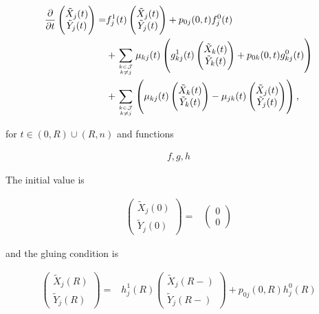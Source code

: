 \documentclass{book}
\newcommand{\1}[1]{\mathbbm{1}_{\left\lbrace #1 \right\rbrace}}
\theoremstyle{break}
\theoremstyle{remark}
\numberwithin{equation}{section}
\begin{document}
\begin{align*}
\frac{\partial}{\partial t} \begin{pmatrix}\tilde{X}_j(t) \\ \tilde{Y}_j(t)\end{pmatrix} =& f_j^1(t) \begin{pmatrix}\tilde{X}_j(t) \\ \tilde{Y}_j(t)\end{pmatrix} + p_{0j}(0,t) f_j^0(t) \\
&+ \sum_{k \in \mathcal{J} \atop k \neq j} \mu_{kj}(t) \left( g_{kj}^1(t) \begin{pmatrix}\tilde{X}_k(t) \\ \tilde{Y}_k(t)\end{pmatrix} + p_{0k}(0,t) g_{kj}^0(t) \right) \\
&+ \sum_{k \in \mathcal{J} \atop k \neq j} \left( \mu_{kj}(t) \begin{pmatrix}\tilde{X}_k(t) \\ \tilde{Y}_k(t)\end{pmatrix} - \mu_{jk}(t) \begin{pmatrix}\tilde{X}_j(t) \\ \tilde{Y}_j(t)\end{pmatrix} \right),
\end{align*}

for $t \in (0,R)\cup(R,n)$ and functions

\begin{align*}
	f,g,h
\end{align*}


The initial value is

\begin{align*}
\begin{pmatrix}\tilde{X}_j(0) \\ \tilde{Y}_j(0)\end{pmatrix} =& \begin{pmatrix}0 \\ 0\end{pmatrix}
\end{align*}

and the gluing condition is

\begin{align*}
\begin{pmatrix}\tilde{X}_j(R) \\ \tilde{Y}_j(R)\end{pmatrix} =& h_j^1(R) \begin{pmatrix}\tilde{X}_j(R-) \\ \tilde{Y}_j(R-)\end{pmatrix} + p_{0j}(0,R) h_j^0(R)
\end{align*}
\end{document}
